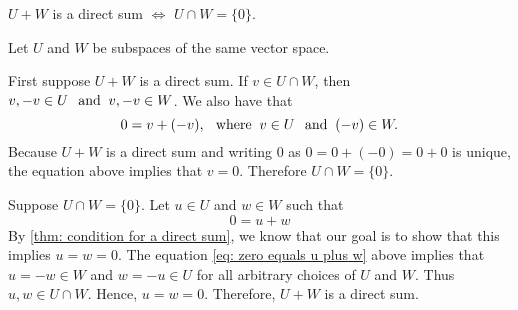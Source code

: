 \setcounter{thm}{45}
\begin{thm} 
  \label{thm: sum and intersection of two subspaces}
  $U+W$ is a direct sum $\iff$ $U \cap W = \{0\}$.
\end{thm}
\begin{prf} Let $U$ and $W$ be subspaces of the same vector space.
  \begin{description}
    \item{\Rightarrowdirection} First suppose $U+W$ is a direct sum. If $v \in U \cap W$, then $v, -v \in U \;\;\, \text{and}\;\; v, -v \in W$. We also have that
    \begin{equation}
      0 = v + (-v), \;\;\, \text{where}\;\; v\in U \;\;\, \text{and}\;\; (-v) \in W.
    \end{equation}
    Because $U+W$  is a direct sum and writing $0$ as $0 = 0+(-0)=0+0$ is unique, the equation above implies that $v=0$. Therefore $U \cap W = \{0\}$.

    \item{\Leftarrowdirection} Suppose $U\cap W = \{0\}$. Let  $u\in U$ and $w \in W$ such that
    \begin{equation}
      \label{eq: zero equals u plus w}
      0 = u+w
    \end{equation}
    By \ref{thm: condition for a direct sum}, we know that our goal is to show that this implies $u=w=0$. The equation \eqref{eq: zero equals u plus w} above implies that $u=-w\in W$  and $w=-u \in U$ for all arbitrary choices of $U$ and $W$. Thus $u,w \in U\cap W$. Hence, $u=w=0$. Therefore, $U+W$ is a direct sum.
  \end{description}
  \vspace{-\baselineskip}
\end{prf}
